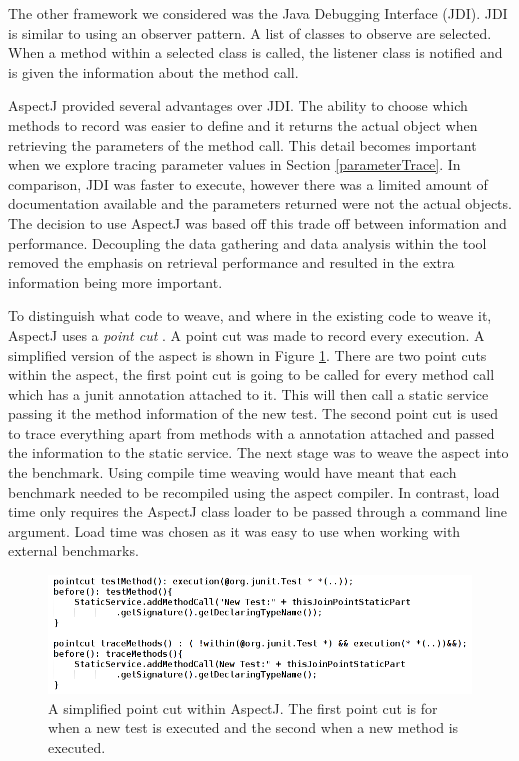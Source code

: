 The other framework we considered was the Java Debugging Interface (JDI). JDI is similar to using an observer pattern. A list of classes to observe are selected. When a method within a selected class is called, the listener class is notified and is given the information about the method call. 

AspectJ provided several advantages over JDI. The ability to choose which methods to record was easier to define and it returns the actual object when retrieving the parameters of the method call. This detail becomes important when we explore tracing parameter values in Section \ref{parameterTrace}. In comparison, JDI was faster to execute, however there was a limited amount of documentation available and the parameters returned were not the actual objects. The decision to use AspectJ was based off this trade off between information and performance. Decoupling the data gathering and data analysis within the tool removed the emphasis on retrieval performance and resulted in the extra information being more important.

To distinguish what code to weave, and where in the existing code to weave it, AspectJ uses a \textit{point cut} \cite{aspectj}. A point cut was made to record every execution. A simplified version of the aspect is shown in Figure \ref{fig:aspectused}. There are two point cuts within the aspect, the first point cut is going to be called for every method call which has a junit \@Test annotation attached to it. This will then call a static service passing it the method information of the new test. The second point cut is used to trace everything apart from methods with a  \@Test annotation attached and passed the information to the static service. The next stage was to weave the aspect into the benchmark. Using compile time weaving would have meant that each benchmark needed to be recompiled using the aspect compiler. In contrast, load time only requires the AspectJ class loader to be passed through a command line argument. Load time was chosen as it was easy to use when working with external benchmarks.

\begin{figure}[h]
\begin{center}
\includegraphics[width = \textwidth]{aspect.png}
\end{center}
\caption{A simplified point cut within AspectJ. The first point cut is for when a new test is executed and the second when a new method is executed.}
\label{fig:aspectused}
\end{figure}

